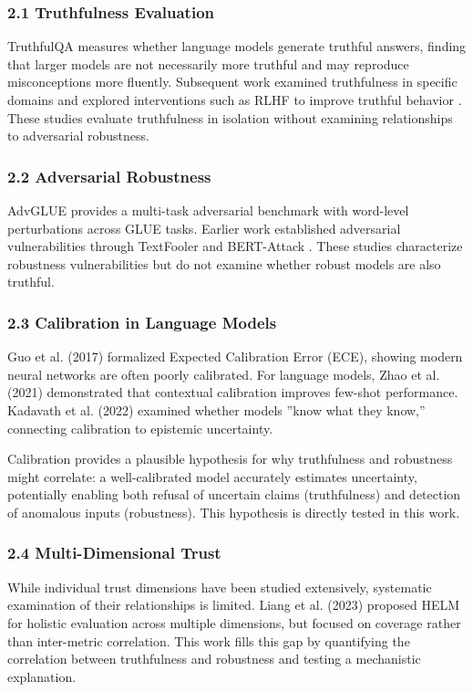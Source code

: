 
\subsubsection{2.1 Truthfulness Evaluation}

TruthfulQA \citep{lin2022truthfulqa} measures whether language models generate truthful answers, finding that larger models are not necessarily more truthful and may reproduce misconceptions more fluently. Subsequent work examined truthfulness in specific domains and explored interventions such as RLHF to improve truthful behavior \citep{ouyang2022instructgpt}. These studies evaluate truthfulness in isolation without examining relationships to adversarial robustness.

\subsubsection{2.2 Adversarial Robustness}

AdvGLUE \citep{wang2022advglue} provides a multi-task adversarial benchmark with word-level perturbations across GLUE tasks. Earlier work established adversarial vulnerabilities through TextFooler \citep{jin2020textfooler} and BERT-Attack \citep{li2020bertattack}. These studies characterize robustness vulnerabilities but do not examine whether robust models are also truthful.

\subsubsection{2.3 Calibration in Language Models}

Guo et al. (2017) formalized Expected Calibration Error (ECE), showing modern neural networks are often poorly calibrated. For language models, Zhao et al. (2021) demonstrated that contextual calibration improves few-shot performance. Kadavath et al. (2022) examined whether models ''know what they know,'' connecting calibration to epistemic uncertainty.

Calibration provides a plausible hypothesis for why truthfulness and robustness might correlate: a well-calibrated model accurately estimates uncertainty, potentially enabling both refusal of uncertain claims (truthfulness) and detection of anomalous inputs (robustness). This hypothesis is directly tested in this work.

\subsubsection{2.4 Multi-Dimensional Trust}

While individual trust dimensions have been studied extensively, systematic examination of their relationships is limited. Liang et al. (2023) proposed HELM for holistic evaluation across multiple dimensions, but focused on coverage rather than inter-metric correlation. This work fills this gap by quantifying the correlation between truthfulness and robustness and testing a mechanistic explanation.
